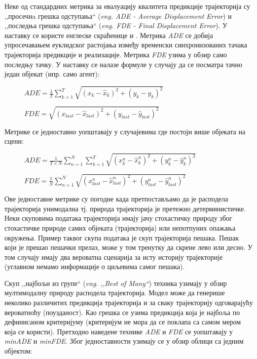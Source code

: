 \documentclass[11pt,oneside]{memoir}
\begin{document}
Неке од стандардних метрика за евалуацију квалитета предикције трајекторија су ,,просечнa грешка одступања`` (\textit{eng. ADE - Average Displacement Error})
и ,,последња грешка одступања`` (\textit{eng. FDE - Final Displacement Error}). У наставку се користе енглеске скраћенице  и
. Метрика \textit{ADE} се добија
упросечавањем еуклидског растојања између временски синхронизованих тачака трајекторија предикције и реализације. 
Метрика \textit{FDE} узима у обзир само последњу тачку. \cite{social_gan} \cite{argoverse} 
У наставку се налазе формуле у случају да се посматра тачно један објекат (нпр. само агент):

\begin{figure}[h!]
  \centering
  $ADE = \frac{1}{T}\sum_{k=1}^{T}\sqrt{(x_k - \hat{x}_k)^2 + (y_k - \hat{y}_k)^2}$
\end{figure}

\begin{figure}[h!]
  \centering
  $FDE = \sqrt{(x_{last} - \hat{x}_{last})^2 + (y_{last} - \hat{y}_{last})^2}$
\end{figure}

Метрике се једноставно уопштавају у случајевима где постоји више објеката на сцени:

\begin{figure}[h!]
  \centering
  $ADE = \frac{1}{T\times N}\sum_{n=1}^{N}\sum_{k=1}^{T}\sqrt{(x^n_k - \hat{x}^n_k)^2 + (y^n_k - \hat{y}^n_k)^2}$
\end{figure}

\begin{figure}[h!]
  \centering
  $FDE = \frac{1}{N}\sum_{n=1}^{N}\sqrt{(x^n_{last} - \hat{x}^n_{last})^2 + (y^n_{last} - \hat{y}^n_{last})^2}$
\end{figure}

Ове једноставне метрике су погодне када претпостављамо да је расподела трајекторија унимодална тј. природа трајекторија је претежно детерминистичке. 
Неки скуповима података трајекторија имају јачу стохастичку природу због стохастичке природе самих објеката (трајекторија) или непотпуних опажања окружења. 
Пример таквог скупа података је скуп трајекторија пешака. Пешак који је прешао пешачки прелаз, може у том тренутку да скрене лево или десно.
У том случају имају два вероватна сценарија за исту историју трајекторије (углавном немамо информације о циљевима самог пешака). \cite{social_gan} \cite{best_of_many_cvae}

Скуп ,,најбољи из групе`` (\textit{eng. ,,Best of Many``}) техника узимају у обзир мултимодалну природу расподела трајекторија. Модел може
да генерише неколико различитих предикција трајекторија и за сваку трајекторију одговарајућу вероватноћу (поузданост). Као грешка се узима предикција
која је најбоља по дефинисаном критеријуму (критеријум не мора да се поклапа са самом мером која се користи). \cite{best_of_many_cvae} \cite{argoverse}
Претходно наведене технике \textit{ADE} и \textit{FDE} се уопштавају у \textit{minADE} и \textit{minFDE}. Због једноставности узимају се у обзир облици
са једним објектом: \cite{Disdis} \cite{best_of_many_cvae}
\end{document}
